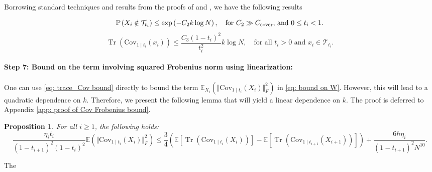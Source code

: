 \documentclass{article}
\theoremstyle{plain}
\newtheorem{proposition}[theorem]{Proposition}
\theoremstyle{definition}
\theoremstyle{remark}
\def\bbE{\mathbb{E}}
\def\bbP{\mathbb{P}}
\def\cT{\mathcal{T}}
\def\Norm#1{\Vert#1\Vert}
\def\pr{{\bbP}}
\def\Cov{\text{Cov}}
\newcommand{\br}[1]{\left({#1}\right)}
\DeclareMathOperator{\Tr}{Tr}
\begin{document}
Borrowing standard techniques and results from the proofs of \citet[Lemma 1]{liang2025low} and \citet[Corollary 1]{liang2025low}, we have the following results

\begin{equation}
    \label{eq: prob of exclusion}
    \pr\br{X_{i} \notin \cT_{t_i} } \le \exp\br{- C_2 k \log N}, \quad \text{for $C_2 \gg C_{\rm cover}$, and $0 \le t_i<1$.}
\end{equation}
\begin{equation}
    \label{eq: trace_Cov bound}
    \Tr(\Cov_{1 \mid t_i}(x_i) )\le \frac{C_3 (1 - t_i)^2}{t_i^2} k \log N, \quad \text{for all $t_i>0$ and $x_i \in \cT_{t_i}$.}
\end{equation}


\paragraph{Step 7: Bound on the term involving squared Frobenius norm using linearization:}
One can use \eqref{eq:  trace_Cov bound} directly to bound the term $\bbE_{X_i}\left(\Norm{\Cov_{1\mid t_i}(X_i)}_F^2\right)$ in \eqref{eq: bound on W}. However, this will lead to a quadratic dependence on $k$. Therefore, we present the following lemma that will yield a linear dependence on $k$. The proof is deferred to Appendix \ref{app: proof of Cov Frobenius bound}.
\begin{proposition}
\label{prop: Main cov bound via trace}
    For all $i\ge 1$, the following holds:
    \begin{equation*}
    \frac{ \eta_{i}t_i}{(1-t_{i+1})^2 (1-t_i)^2}  \bbE(\Norm{\Cov_{1\mid t_i}(X_i)}_F^2)  \le \frac{3}{4} \left(\bbE [\Tr(\Cov_{1\mid t_i}(X_i))] - \bbE[\Tr(\Cov_{1\mid t_{i+1}}(X_{i+1}))]\right) + \frac{6 h \eta_{i} }{(1-t_{i+1})^2 N^{10}}.
\end{equation*}
    
\end{proposition}
The 
\end{document}
